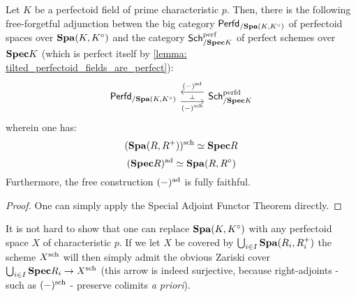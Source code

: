                 \begin{claim} 
                    Let $K$ be a perfectoid field of prime characteristic $p$. Then, there is the following free-forgetful adjunction betwen the big category $\mathsf{Perfd}_{/\mathbf{Spa}(K, K^{\circ})}$ of perfectoid spaces over $\mathbf{Spa}(K, K^{\circ})$ and the category $\mathsf{Sch}^{\mathrm{perf}}_{/\mathbf{Spec} K}$ of perfect schemes over $\mathbf{Spec} K$ (which is perfect itself by \ref{lemma: tilted_perfectoid_fields_are_perfect}):
                        $$
                            \begin{tikzcd}
                            	{\Perfd_{/\Spa(K, K^{\circ})}} & {\Sch^{\perfd}_{/\Spec K}}
                            	\arrow[""{name=0, anchor=center, inner sep=0}, "(-)^{\sch}"', shift right=2, from=1-1, to=1-2]
                            	\arrow[""{name=1, anchor=center, inner sep=0}, "{(-)^{\ad}}"', shift right=2, from=1-2, to=1-1]
                            	\arrow["\dashv"{anchor=center, rotate=-90}, draw=none, from=1, to=0]
                            \end{tikzcd}
                        $$
                    wherein one has:
                        $$(\mathbf{Spa}(R, R^+))^{\mathrm{sch}} \simeq \mathbf{Spec} R$$
                        $$(\mathbf{Spec} R)^{\mathrm{ad}} \simeq \mathbf{Spa}(R, R^{\circ})$$
                    Furthermore, the free construction $(-)^{\mathrm{ad}}$ is fully faithful.
                \end{claim}
                    \begin{proof}
                        One can simply apply the Special Adjoint Functor Theorem directly.        
                    \end{proof}
                \begin{remark}
                    It is not hard to show that one can replace $\mathbf{Spa}(K, K^{\circ})$ with any perfectoid space $X$ of characteristic $p$. If we let $X$ be covered by $\bigcup_{i \in I} \mathbf{Spa}(R_i, R_i^+)$ the scheme $X^{\mathrm{sch}}$ will then simply admit the obvious Zariski cover $\bigcup_{i \in I} \mathbf{Spec} R_i \to X^{\mathrm{sch}}$ (this arrow is indeed surjective, because right-adjoints - such as $(-)^{\mathrm{sch}}$ - preserve colimits \textit{a priori}). 
                \end{remark}
                
